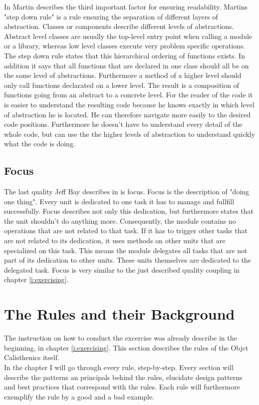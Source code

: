 In \cite{cc} Martin describes the third important factor for ensuring readability. Martins "step down rule" is a rule ensuring the separation of different layers of abstraction. Classes or components describe different levels of abstractions. Abstract level classes are usually the top-level entry point when calling a module or a library, whereas low level classes execute very problem specific operations. The step down rule states that this hierarchical ordering of functions exists. In addition it says that all functions that are declared in one class should all be on the same level of abstractions. Furthermore a method of a higher level should only call functions declarated on a lower level. The result is a composition of functions going from an abstract to a concrete level. For the reader of the code it is easier to understand the resulting code because he knows exactly in which level of abstraction he is located. He can therefore navigate more easily to the desired code positions. Furthermore he doesn't have to understand every detail of the whole code, but can use the the higher levels of abstraction to understand quickly what the code is doing. 

\subsection*{Focus}
\label{focus}
The last quality Jeff Bay describes in \cite{oc2008} is focus. Focus is the description of "doing one thing". Every unit is dedicated to one task it has to manage and fullfill successfully. Focus describes not only this dedication, but furthermore states that the unit shouldn't do anything more. Consequently, the module contains no operations that are not related to that task. If it has to trigger other tasks that are not related to its dedication, it uses methods on other units that are specialized on this task. This means the module delegates all tasks that are not part of its dedication to other units. These units themselves are dedicated to the delegated task. Focus is very similar to the just described quality coupling in chapter \ref{i:exercising}.

\section{The Rules and their Background}
\label{d:background}
 The instruction on how to conduct the excercise was already describe in the beginning, in chapter \ref{i:exercising}. This section describes the rules of the Objct Calisthenics itself. \\
 In the chapter I will go through every rule, step-by-step. Every section will describe the patterns an principals behind the rules, elucidate design patterns and best practices that correspond with the rules. Each rule will furthermore exemplify the rule by a good and a bad example. 

